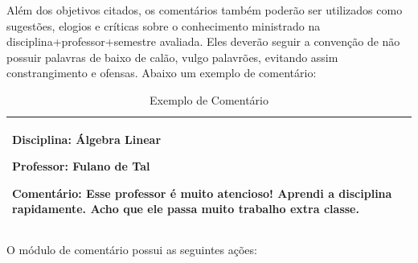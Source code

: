 \documentclass[12pt, a4paper]{report}
\begin{document}
Além dos objetivos citados, os comentários também poderão ser utilizados como sugestões, elogios e críticas sobre o conhecimento ministrado na disciplina+professor+semestre avaliada. Eles deverão seguir a convenção de não possuir palavras de baixo de calão, vulgo palavrões, evitando assim constrangimento e ofensas. Abaixo um exemplo de comentário:

\begin{table}[h]
 \centering
 {\renewcommand\arraystretch{1.25}
 \begin{tabular}{ l l }
  \cline{1-1}\cline{2-2}  
    \multicolumn{1}{|p{7.850cm}|}{\par \textbf{Disciplina:} Álgebra Linear
    \par \textbf{Professor:} Fulano de Tal
    \par \textbf{Comentário:} Esse professor é muito atencioso! Aprendi a disciplina rapidamente. Acho que ele passa muito trabalho extra classe.}
  \\  
  \hline
 \end{tabular}}
 \caption{Exemplo de Comentário}
\end{table}

O módulo de comentário possui as seguintes ações:
\end{document}
